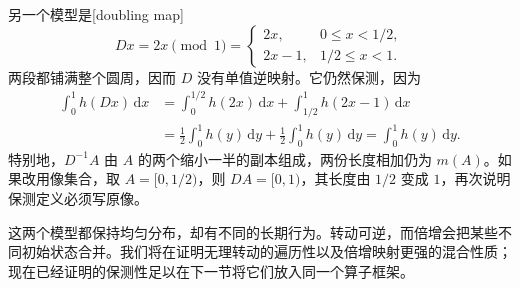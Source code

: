 \ProseParagraphBreak

另一个模型是[doubling map]
\[
 D x=2x\pmod1
 =\begin{cases}2x,&0\leq x<1/2,\\2x-1,&1/2\leq x<1.\end{cases}
\]
两段都铺满整个圆周，因而 \(D\) 没有单值逆映射。它仍然保测，因为
\[
 \begin{aligned}
 \int_0^1 h(Dx)\,\mathrm dx
 &=\int_0^{1/2}h(2x)\,\mathrm dx
   +\int_{1/2}^1h(2x-1)\,\mathrm dx\\
 &=\frac12\int_0^1h(y)\,\mathrm dy
   +\frac12\int_0^1h(y)\,\mathrm dy
 =\int_0^1h(y)\,\mathrm dy.
 \end{aligned}
\]
特别地，\(D^{-1}A\) 由 \(A\) 的两个缩小一半的副本组成，两份长度相加仍为 \(m(A)\)。如果改用像集合，取 \(A=[0,1/2)\)，则 \(DA=[0,1)\)，其长度由 \(1/2\) 变成 \(1\)，再次说明保测定义必须写原像。

\ProseParagraphBreak

这两个模型都保持均匀分布，却有不同的长期行为。转动可逆，而倍增会把某些不同初始状态合并。我们将在证明无理转动的遍历性以及倍增映射更强的混合性质；现在已经证明的保测性足以在下一节将它们放入同一个算子框架。
